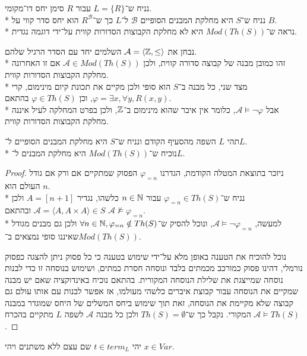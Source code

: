 \subquestion{}
נניח ש־$L = \{ R \}$ עבור $R$ סימן יחס דו־מקומי. \\*
נניח ש־$S$ היא מחלקת המבנים הסופיים $\mathcal{B}$ ל־$L$ כך ש־$R^\mathcal{B}$ הוא יחס סדר קווי על $B$. \\*
נראה ש־$Mod(Th(S))$ היא לא מחלקת הקבוצות הסדורות קווית על־ידי דוגמה נגדית.
\begin{solution}
	נבחן את $\mathcal{A} = \langle \mathbb{Z}, \le \rangle$ השלמים יחד עם הסדר הרגיל שלהם. \\*
	זהו כמובן מבנה של קבוצה סדורה קווית, ולכן $\mathcal{A} \in Mod(Th(S))$ אם זו האחרונה מחלקת הקבוצות הסדורות קווית. \\*
	מצד שני, כל מבנה ב־$S$ הוא סופי ולכן מקיים את תכונת קיום מינימום, קרי $\varphi = \exists x, \forall y, R(x, y)$, וכן $\varphi \in Th(S)$ בהתאם. \\*
	אבל $\mathcal{A} \models \lnot \varphi$, כלומר אין איבר שהוא מינימום ב־$\mathbb{Z}$, ולכן בפרט המחלקה לעיל איננה מחלקת הקבוצות הסדורות קווית.
\end{solution}

\subquestion{}
תהי $L$ השפה מהסעיף הקודם ונניח ש־$S$ היא מחלקת המבנים הסופיים ל־$L$. \\*
נוכיח ש־$Mod(Th(S))$ היא מחלקת המבנים ל־$L$.
\begin{proof}
	ניזכר בתוצאת המטלה הקודמת, הגדרנו $\varphi_{=n}$ הפסוק שמתקיים אם ורק אם גודל העולם הוא $n$. \\*
	נניח ש־$\varphi_{=n} \in Th(S)$ עבור $n \in \mathbb{N}$ כלשהו, נגדיר $A = [n + 1]$ ולכן $\mathcal{A} = \langle A, A \times A \rangle \in S$ ובהתאם $\mathcal{A} \not\models \varphi_{=n}$. \\*
	למעשה, $\mathcal{A} \models \lnot \varphi_{=n}$, ונוכל להסיק ש־$\forall n \in \mathbb{N}, \varphi_{=n} \notin Th(S)$ ולכן גם מבנים מגודל שאיננו סופי נמצאים ב־$Mod(Th(S))$.

	נוכל להוכיח את הטענה באופן מלא על־ידי שימוש בטענה כי כל פסוק ניתן להצגה כפסוק נורמלי, דהינו פסוק כמורכב מכמתים בלבד ונוסחה חסרת כמתים, ושימוש בנוסחה זו כדי לבנות נוסחה שמייצגת את שלילת הנוסחה המקורית.
	בהתאם נוכיח באינדוקציה שאם יש מבנה שמקיים את הנוסחה עבור קבוצת איברים כלשהי מעולמו, אז אפשר לבנות עם אותו עולם גם קבוצה שלא מקיימת את הנוסחה, זאת תוך שימוש ביחס המשלים של היחס שמוגדר במבנה המקורי.
	נקבל כך ש־$Th(S) = \emptyset$ ולכן כל מבנה $\mathcal{A}$ לשפה $L$ מתקיים בהכרח $\mathcal{A} \models Th(S)$.
\end{proof}

\question{}
יהי $t \in term_L$ שם עצם ללא משתנים ויהי $x \in Var$.


